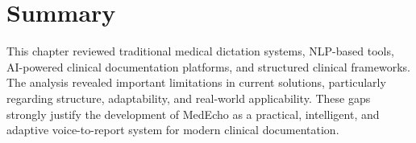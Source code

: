 \section{Summary}
\label{sec:lit:summary}

This chapter reviewed traditional medical dictation systems, NLP-based tools, AI-powered clinical documentation platforms, and structured clinical frameworks. The analysis revealed important limitations in current solutions, particularly regarding structure, adaptability, and real-world applicability. These gaps strongly justify the development of MedEcho as a practical, intelligent, and adaptive voice-to-report system for modern clinical documentation.